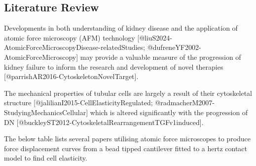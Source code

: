 \documentclass[
  paper=a4,
  ,captions=tableheading
]{scrartcl}
\begin{document}
\subsection{Literature Review}\label{literature-review}

Developments in both understanding of kidney disease and the application
of atomic force microscopy (AFM) technology
{[}@liuS2024-AtomicForceMicroscopyDisease-relatedStudies;
@dufreneYF2002-AtomicForceMicroscopy{]} may provide a valuable measure
of the progression of kidney failure to inform the research and
development of novel therapies
{[}@parrishAR2016-CytoskeletonNovelTarget{]}.

The mechanical properties of tubular cells are largely a result of their
cytoskeletal structure {[}@jalilianI2015-CellElasticityRegulated;
@radmacherM2007-StudyingMechanicsCellular{]} which is altered
significantly with the progression of DN
{[}@buckleyST2012-CytoskeletalRearrangementTGFv1induced{]}.

The below table lists several papers utilising atomic force microscopes
to produce force displacement curves from a bead tipped cantilever
fitted to a hertz contact model to find cell elasticity.
\end{document}
